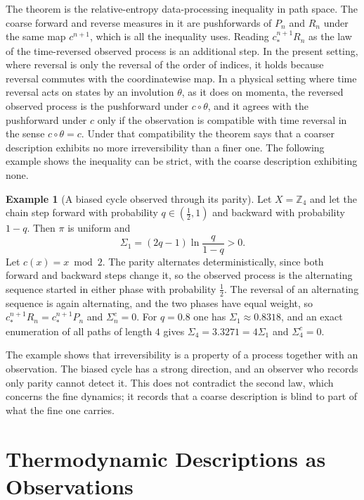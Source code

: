 \documentclass[11pt,oneside]{book}
\theoremstyle{definition}
\newtheorem{example}[theorem]{Example}
\theoremstyle{remark}
\begin{document}
The theorem is the relative-entropy data-processing inequality in path space. The coarse forward and reverse measures in it are pushforwards of $P_n$ and $R_n$ under the same map $c^{n+1}$, which is all the inequality uses. Reading $c^{n+1}_*R_n$ as the law of the time-reversed observed process is an additional step. In the present setting, where reversal is only the reversal of the order of indices, it holds because reversal commutes with the coordinatewise map. In a physical setting where time reversal acts on states by an involution $\theta$, as it does on momenta, the reversed observed process is the pushforward under $c\circ\theta$, and it agrees with the pushforward under $c$ only if the observation is compatible with time reversal in the sense $c\circ\theta=c$. Under that compatibility the theorem says that a coarser description exhibits no more irreversibility than a finer one. The following example shows the inequality can be strict, with the coarse description exhibiting none.

\begin{example}[A biased cycle observed through its parity]\label{ex:cycle-parity}
Let $X=\mathbb Z_4$ and let the chain step forward with probability $q\in(\tfrac12,1)$ and backward with probability $1-q$. Then $\pi$ is uniform and
\[
\Sigma_1=(2q-1)\ln\frac{q}{1-q}>0 .
\]
Let $c(x)=x\bmod2$. The parity alternates deterministically, since both forward and backward steps change it, so the observed process is the alternating sequence started in either phase with probability $\tfrac12$. The reversal of an alternating sequence is again alternating, and the two phases have equal weight, so $c^{n+1}_*R_n=c^{n+1}_*P_n$ and $\Sigma_n^c=0$. For $q=0.8$ one has $\Sigma_1\approx0.8318$, and an exact enumeration of all paths of length $4$ gives $\Sigma_4=3.3271=4\Sigma_1$ and $\Sigma_4^c=0$.
\end{example}

The example shows that irreversibility is a property of a process together with an observation. The biased cycle has a strong direction, and an observer who records only parity cannot detect it. This does not contradict the second law, which concerns the fine dynamics; it records that a coarse description is blind to part of what the fine one carries.

\chapter{Thermodynamic Descriptions as Observations}\label{ch:thermo}
\end{document}
